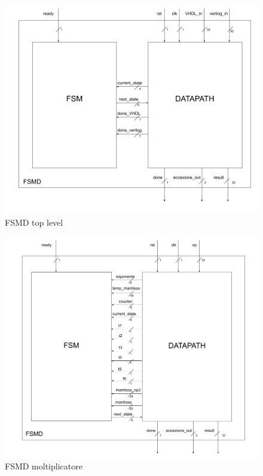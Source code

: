 \documentclass[]{IEEEtran}
\begin{document}
\begin{figure}[bt]
	\centering
	\includegraphics[width=\textwidth]{figures/fsmd_tl.png}
	\caption{FSMD top level}
	\label{fig:fsmdtl}
\end{figure}

\begin{figure}[bt]
	\centering
	\includegraphics[width=\textwidth]{figures/fsmd_mul.png}
	\caption{FSMD moltiplicatore}
	\label{fig:fsmdmul}
\end{figure}
\end{document}
